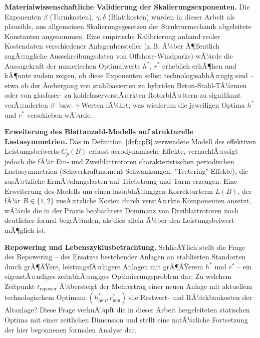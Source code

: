﻿\documentclass[a4paper,12pt]{article}
\theoremstyle{definition}
\begin{document}
\textbf{Materialwissenschaftliche Validierung der Skalierungsexponenten.} Die Exponenten $\beta$ (Turmkosten), $\gamma,\delta$ (Blattkosten) wurden in dieser Arbeit als plausible, aus allgemeinen Skalierungsgesetzen der Strukturmechanik abgeleitete Konstanten angenommen. Eine empirische Kalibrierung anhand realer Kostendaten verschiedener Anlagenhersteller (z.\,B. Ã¼ber Ã¶ffentlich zugÃ¤ngliche Ausschreibungsdaten von Offshore-Windparks) wÃ¼rde die Aussagekraft der numerischen Optimalwerte $h^*$, $r^*$ erheblich erhÃ¶hen und kÃ¶nnte zudem zeigen, ob diese Exponenten selbst technologieabhÃ¤ngig sind -- etwa ob der Ãœbergang von stahlbasierten zu hybriden Beton-Stahl-TÃ¼rmen oder von glasfaser- zu kohlefaserverstÃ¤rkten RotorblÃ¤ttern zu signifikant verÃ¤nderten $\beta$- bzw. $\gamma$-Werten fÃ¼hrt, was wiederum die jeweiligen Optima $h^*$ und $r^*$ verschieben wÃ¼rde.

\textbf{Erweiterung des Blattanzahl-Modells auf strukturelle Lastasymmetrien.} Das in Definition~\ref{def:cpB} verwendete Modell des effektiven Leistungsbeiwerts $C_p(B)$ erfasst aerodynamische Effekte, vernachlÃ¤ssigt jedoch die fÃ¼r Ein- und Zweiblattrotoren charakteristischen periodischen Lastasymmetrien (Schwerkraftmoment-Schwankungen, "Teetering"-Effekte), die zusÃ¤tzliche ErmÃ¼dungslasten auf Triebstrang und Turm erzeugen. Eine Erweiterung des Modells um einen lastabhÃ¤ngigen Korrekturterm $L(B)$, der fÃ¼r $B\in\{1,2\}$ zusÃ¤tzliche Kosten durch verstÃ¤rkte Komponenten ansetzt, wÃ¼rde die in der Praxis beobachtete Dominanz von Dreiblattrotoren noch deutlicher formal begrÃ¼nden, als dies allein Ã¼ber den Leistungsbeiwert mÃ¶glich ist.

\textbf{Repowering und Lebenszyklusbetrachtung.} SchlieÃŸlich stellt die Frage des Repowering -- des Ersatzes bestehender Anlagen an etablierten Standorten durch grÃ¶ÃŸere, leistungsfÃ¤higere Anlagen mit grÃ¶ÃŸerem $h^*$ und $r^*$ -- ein eigenstÃ¤ndiges zeitabhÃ¤ngiges Optimierungsproblem dar: Zu welchem Zeitpunkt $t_{\mathrm{repower}}$ Ã¼bersteigt der Mehrertrag einer neuen Anlage mit aktuellem technologischem Optimum $(h^*_{\mathrm{neu}}, r^*_{\mathrm{neu}})$ die Restwert- und RÃ¼ckbaukosten der Altanlage? Diese Frage verknÃ¼pft die in dieser Arbeit hergeleiteten statischen Optima mit einer zeitlichen Dimension und stellt eine natÃ¼rliche Fortsetzung der hier begonnenen formalen Analyse dar.
\end{document}
